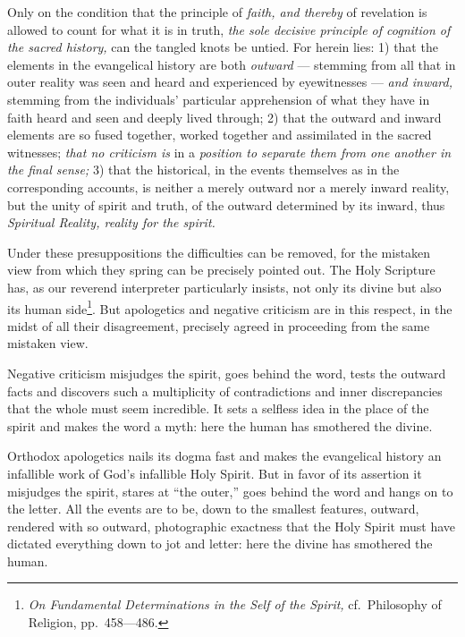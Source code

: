 \documentclass[12pt,a4paper,openany]{book}
\newcommand{\opage}[1]{\marginnote{\footnotesize\textit{[#1]}}}
\begin{document}
Only on the condition that the principle of \emph{faith, and thereby}
of revelation is allowed to count for
what it is in truth, \emph{the sole decisive
principle of cognition of the sacred history,} can
the tangled knots be untied. For herein lies: 1) that
the elements in the evangelical history are both \emph{outward}
--- stemming from all that in outer
reality was seen and heard and experienced by eyewitnesses ---
\emph{and inward,} stemming from the individuals' particular apprehension
of what they have in faith heard and seen and deeply
lived through; 2) that the outward and inward elements are
so fused together, worked together and assimilated
in the sacred witnesses; \emph{that no criticism is}
in a \emph{position to separate them from one another
in the final sense;} 3) that the historical, in the events
themselves as in the corresponding accounts, is neither
a merely outward nor a merely inward
\setcounter{footnote}{0}%
\opage{323}reality, but the unity of spirit and truth, of the
outward determined by its inward, thus \emph{Spiritual Reality,
reality for the spirit.}

Under these presuppositions the difficulties can be
removed, for the mistaken view from which they spring can be precisely
pointed out. The Holy Scripture has, as our reverend   %
interpreter particularly insists, not only its
divine but also its human side\footnote[1]{\emph{On Fundamental Determinations in the Self of the Spirit,} cf.\ Philosophy of Religion, pp.\ 458—486.}. But
apologetics and negative criticism are in this respect,
in the midst of all their disagreement, precisely agreed in proceeding
from the same mistaken view.

Negative criticism misjudges the spirit, goes behind
the word, tests the outward facts and discovers
such a multiplicity of contradictions and inner
discrepancies that the whole must seem incredible.
It sets a selfless idea in the place of the spirit and makes the word
a myth: here the human has smothered the divine.

Orthodox apologetics nails its dogma fast
and makes the evangelical history an infallible work
of God's infallible Holy Spirit. But in favor of its
assertion it misjudges the spirit, stares at ``the outer,''
goes behind the word and hangs on to the letter. All
the events are to be, down to the smallest features, outward,
rendered with so outward, photographic
exactness that the Holy Spirit must have dictated everything
down to jot and letter: here the divine has
smothered the human.
\end{document}

